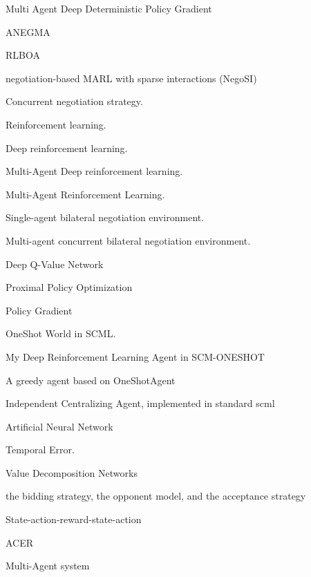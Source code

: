 %
{%
Multi Agent Deep Deterministic Policy Gradient
}

%
{%
ANEGMA
}

%
{%
RLBOA
}

%
{%
negotiation-based MARL with sparse interactions (NegoSI)
}

%
{%
Concurrent negotiation strategy.
}

%
{%
Reinforcement learning.
}

%
{%
Deep reinforcement learning.
}

%
{%
Multi-Agent Deep reinforcement learning.
}

%
{%
Multi-Agent Reinforcement Learning.
}

%
{%
Single-agent bilateral negotiation environment.
}

%
{%
Multi-agent concurrent bilateral negotiation environment.
}

%
{%
Deep Q-Value Network
}

%
{%
Proximal Policy Optimization
}

%
{%
Policy Gradient
}

%
{%
OneShot World in SCML.
}

%
{%
My Deep Reinforcement Learning Agent in SCM-ONESHOT
}

%
{%
A greedy agent based on OneShotAgent
}

%
{%
Independent Centralizing Agent, implemented in standard scml
}

%
{%
Artificial Neural Network
}

%
{%
Temporal Error.
}

%
{%
Value Decomposition Networks
}

%
{%
the bidding strategy, the opponent model, and the acceptance strategy
}

%
{%
State-action-reward-state-action
}

%
{%
ACER
}

%
{%
Multi-Agent system
}

